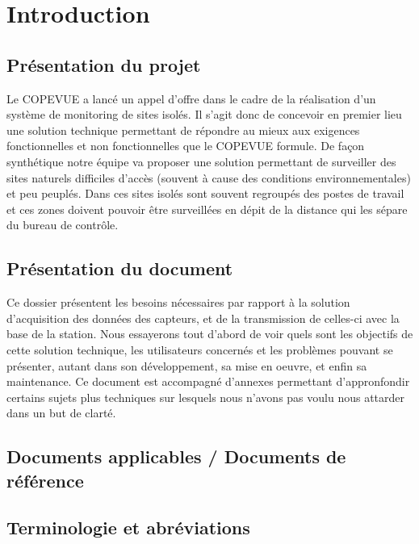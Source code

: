 ﻿\section{Introduction}

\subsection{Présentation du projet}
Le COPEVUE a lancé un appel d'offre dans le cadre de la réalisation d'un système de monitoring de sites isolés. Il s'agit donc de concevoir en premier lieu une solution technique permettant de répondre au mieux aux exigences fonctionnelles et non fonctionnelles que le COPEVUE formule. De façon synthétique notre équipe va proposer une solution permettant de surveiller des sites naturels difficiles d'accès (souvent à cause des conditions environnementales) et peu peuplés. Dans ces sites isolés sont souvent regroupés des postes de travail et ces zones doivent pouvoir être surveillées en dépit de la distance qui les sépare du bureau de contrôle.

\subsection{Présentation du document}

Ce dossier présentent les besoins nécessaires par rapport à la solution d'acquisition des données des capteurs, et de la transmission de celles-ci avec la base de la station. Nous essayerons tout d'abord de voir quels sont les objectifs de cette solution technique, les utilisateurs concernés et les problèmes pouvant se présenter, autant dans son développement, sa mise en oeuvre, et enfin sa maintenance. Ce document est accompagné d'annexes permettant d'appronfondir certains sujets plus techniques sur lesquels nous n'avons pas voulu nous attarder dans un but de clarté.

\subsection{Documents applicables / Documents de référence}


\subsection{Terminologie et abréviations}


